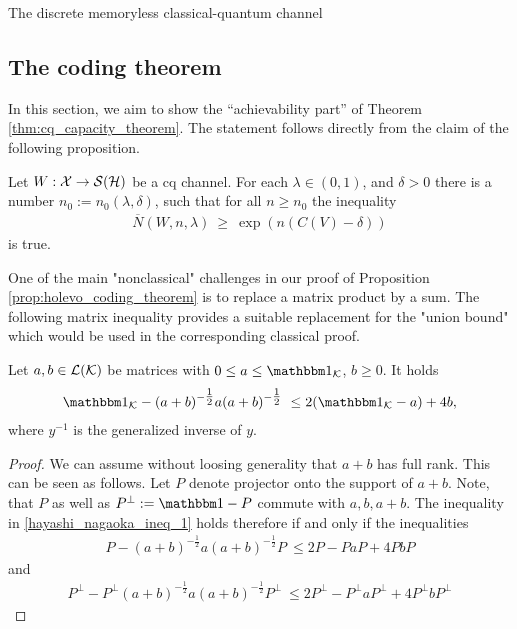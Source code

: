\begin{section}{The discrete memoryless  classical-quantum channel}
     \subsection{The coding theorem}
      In this section, we aim to show the ``achievability part'' of Theorem \ref{thm:cq_capacity_theorem}. The statement follows directly from the claim of the following proposition. 
     \begin{proposition} \label{prop:holevo_coding_theorem}
       Let $W: {\mathcal X} \rightarrow {\mathcal S}({\mathcal H})$ be a cq channel. For each $\lambda \in (0,1)$, and $\delta > 0$ there is a number $n_0 := n_0(\lambda,\delta)$, such that for all $n \geq n_0$ the 
       inequality
       \begin{align*}
        \overline{N}(W,n,\lambda) \ \geq \ \exp\left(n(C(V) - \delta) \right)
       \end{align*}
       is true. 
      \end{proposition}
       One of the main "nonclassical" challenges in our proof of Proposition \ref{prop:holevo_coding_theorem} is to replace a matrix product by a sum. The following matrix inequality provides a suitable replacement for the "union bound" which would be used in the corresponding classical proof. 
      \begin{lemma} \label{hayashi_nagaoka_ineq}
       Let $a, b \in {\mathcal L}({\mathcal K})$ be matrices with $0 \leq a \leq \bbmeins_{\cK}$, $b \geq 0$. It holds
       \begin{align}
        \bbmeins_\cK - (a+b)^{-\tfrac{1}{2}} a (a+b)^{-\tfrac{1}{2}} \ \leq 2(\bbmeins_\cK - a) + 4b, \label{hayashi_nagaoka_ineq_1}
       \end{align}
       where $y^{-1}$ is the generalized inverse of $y$.
      \end{lemma}
       \begin{proof}
        We can assume without loosing generality that $a+b$ has full rank. This can be seen as follows. Let $P$ denote projector onto the support of $a+b$. Note, that $P$ as well as $P^\perp := \bbmeins - P$ commute with $a, b, a+b$. The inequality in \ref{hayashi_nagaoka_ineq_1} holds therefore if and only if the inequalities 
        \begin{align}
        P - (a+b)^{-\tfrac{1}{2}} a (a+b)^{-\tfrac{1}{2}}P \ \leq 2P - PaP + 4PbP
        \label{hayashi_nagaoka_ineq_2}
        \end{align}
        and 
        \begin{align}
        P^\perp - P^\perp(a+b)^{-\tfrac{1}{2}} a (a+b)^{-\tfrac{1}{2}}P^\perp \ \leq 2P^\perp - P^\perp aP^\perp + 4P^\perp bP^\perp \label{hayashi_nagaoka_ineq_3}

\end{align}
\end{proof}
\end{section}
